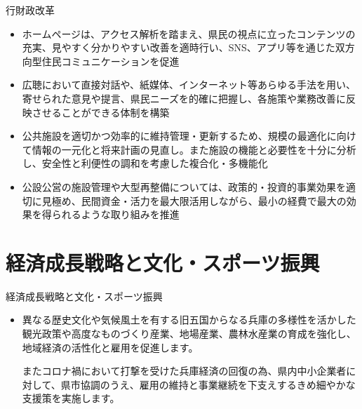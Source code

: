 \documentclass[dvipdfmx]{beamer}
\begin{document}
    \begin{frame}{行財政改革}{}
        \begin{small}
            \begin{itemize}
                \setlength{\parsep}{.5mm}
                \setlength{\itemsep}{2mm}
                \item ホームページは、アクセス解析を踏まえ、県民の視点に立ったコンテンツの充実、見やすく分かりやすい改善を適時行い、SNS、アプリ等を通じた双方向型住民コミュニケーションを促進
                \item 広聴において直接対話や、紙媒体、インターネット等あらゆる手法を用い、寄せられた意見や提言、県民ニーズを的確に把握し、各施策や業務改善に反映させることができる体制を構築
                \item 公共施設を適切かつ効率的に維持管理・更新するため、規模の最適化に向けて情報の一元化と将来計画の見直し。また施設の機能と必要性を十分に分析し、安全性と利便性の調和を考慮した複合化・多機能化
                \item 公設公営の施設管理や大型再整備については、政策的・投資的事業効果を適切に見極め、民間資金・活力を最大限活用しながら、最小の経費で最大の効果を得られるような取り組みを推進
            \end{itemize}
        \end{small}
    \end{frame}

\section{経済成長戦略と文化・スポーツ振興}
    \begin{frame}{}{}
        \sectionpage
    \end{frame}
    
    \begin{frame}{経済成長戦略と文化・スポーツ振興}{}
        \begin{small}
            \begin{itemize}
                \setlength{\parsep}{.5mm}
                \setlength{\itemsep}{2mm}
                \item 異なる歴史文化や気候風土を有する旧五国からなる兵庫の多様性を活かした観光政策や高度なものづくり産業、地場産業、農林水産業の育成を強化し、地域経済の活性化と雇用を促進します。\par
                またコロナ禍において打撃を受けた兵庫経済の回復の為、県内中小企業者に対して、県市協調のうえ、雇用の維持と事業継続を下支えするきめ細やかな支援策を実施します。
            \end{itemize}
        \end{small}
    \end{frame}
    
\end{document}
